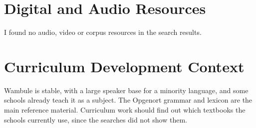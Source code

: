 \documentclass[12pt]{article}
\begin{document}
\section{Digital and Audio Resources}
I found no audio, video or corpus resources in the search results.

\section{Curriculum Development Context}
Wambule is stable, with a large speaker base for a minority language, and some schools already teach it as a subject. The Opgenort grammar and lexicon are the main reference material. Curriculum work should find out which textbooks the schools currently use, since the searches did not show them.
\end{document}
